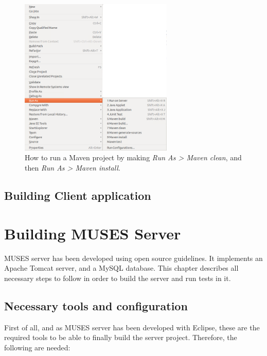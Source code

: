 \documentclass[a4paper,11pt]{book}
\begin{document}
\begin{figure}
  \begin{center}
    \includegraphics[width=0.65\textwidth]{./Figures/runAs.png}
    \caption{How to run a Maven project by making \textit{Run As > Maven clean}, and then \textit{Run As > Maven install}.}
    \label{fig:RunAs}
  \end{center}
\end{figure}

\section{Building Client application}
\label{sec:buildclient}



\chapter{Building MUSES Server}
\label{ch:server}

MUSES server has been developed using open source guidelines. It implements an Apache Tomcat server, and a MySQL database. This chapter describes all necessary steps to follow in order to build the server and run tests in it.

\section{Necessary tools and configuration}
\label{sec:serverpreliminaries}

First of all, and as MUSES server has been developed with Eclipse, these are the required tools to be able to finally build the server project. Therefore, the following are needed:
\end{document}
